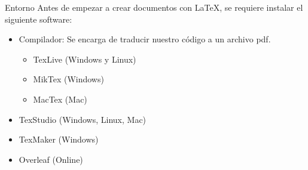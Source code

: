 \documentclass[10pt,xcolor={dvipsnames}]{beamer}
\begin{document}
\begin{frame}{Entorno}
	Antes de empezar a crear documentos con LaTeX, se requiere instalar el
	siguiente software:
	\begin{itemize}
		\item Compilador: Se encarga de traducir nuestro código a un archivo pdf.
		\begin{itemize}
			\item TexLive (Windows y Linux) 
			\item MikTex (Windows)
			\item MacTex (Mac)
		\end{itemize}
		\item TexStudio (Windows, Linux, Mac)
		\item TexMaker (Windows)
		\item Overleaf (Online)
	\end{itemize}
\end{frame}



{\1
\begin{frame}
\end{frame}}
\end{document}
